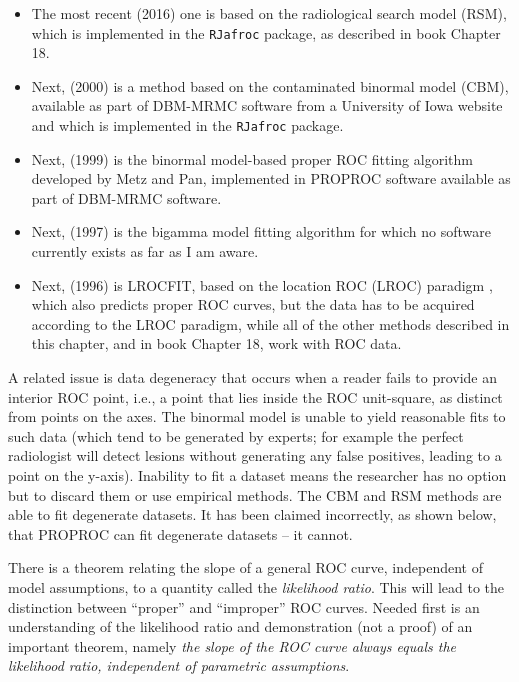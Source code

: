 \documentclass[
]{book}
\begin{document}
\begin{itemize}
\item
  The most recent (2016) one \citep{chakraborty2011estimating, chakraborty2012inverse} is based on the radiological search model (RSM), which is implemented in the \texttt{RJafroc} package, as described in book Chapter 18.
\item
  Next, (2000) is a method \citep{dorfman2000contaminated1, dorfman2000contaminated2, dorfman2000contaminated3} based on the contaminated binormal model (CBM), available as part of DBM-MRMC software from a University of Iowa website and which is implemented in the \texttt{RJafroc} package.
\item
  Next, (1999) is the binormal model-based proper ROC fitting algorithm \citep{metz1999proper, pan1997proper} developed by Metz and Pan, implemented in PROPROC software available as part of DBM-MRMC software.
\item
  Next, (1997) is the bigamma model \citep{dorfman1997proper} fitting algorithm for which no software currently exists as far as I am aware.
\item
  Next, (1996) is LROCFIT, based on the location ROC (LROC) paradigm \citep{swensson1996unified}, which also predicts proper ROC curves, but the data has to be acquired according to the LROC paradigm, while all of the other methods described in this chapter, and in book Chapter 18, work with ROC data.
\end{itemize}

A related issue is data degeneracy that occurs when a reader fails to provide an interior ROC point, i.e., a point that lies inside the ROC unit-square, as distinct from points on the axes. The binormal model is unable to yield reasonable fits to such data (which tend to be generated by experts; for example the perfect radiologist will detect lesions without generating any false positives, leading to a point on the y-axis). Inability to fit a dataset means the researcher has no option but to discard them or use empirical methods. The CBM and RSM methods are able to fit degenerate datasets. It has been claimed incorrectly, as shown below, that PROPROC can fit degenerate datasets -- it cannot.

There is a theorem relating the slope of a general ROC curve, independent of model assumptions, to a quantity called the \emph{likelihood ratio}. This will lead to the distinction between ``proper'' and ``improper'' ROC curves. Needed first is an understanding of the likelihood ratio and demonstration (not a proof) of an important theorem, namely \emph{the slope of the ROC curve always equals the likelihood ratio, independent of parametric assumptions}.
\end{document}
